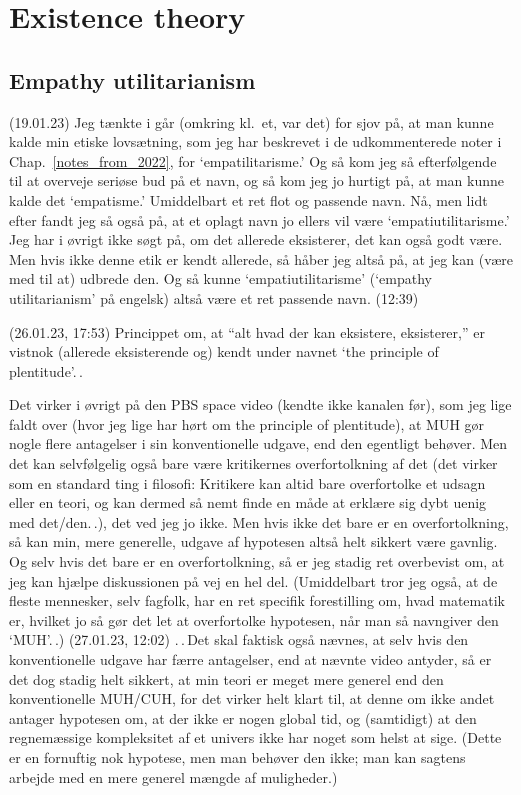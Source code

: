 \documentclass{report}
\begin{document}
\chapter{Existence theory}


\section{Empathy utilitarianism}

(19.01.23) Jeg tænkte i går (omkring kl.\ et, var det) for sjov på, at man kunne kalde min etiske lovsætning, som jeg har beskrevet i de udkommenterede noter i Chap.\ \ref{notes_from_2022}, for `empatilitarisme.' Og så kom jeg så efterfølgende til at overveje seriøse bud på et navn, og så kom jeg jo hurtigt på, at man kunne kalde det `empatisme.' Umiddelbart et ret flot og passende navn. Nå, men lidt efter fandt jeg så også på, at et oplagt navn jo ellers vil være `empatiutilitarisme.' Jeg har i øvrigt ikke søgt på, om det allerede eksisterer, det kan også godt være. Men hvis ikke denne etik er kendt allerede, så håber jeg altså på, at jeg kan (være med til at) udbrede den. Og så kunne `empatiutilitarisme' (`empathy utilitarianism' på engelsk) altså være et ret passende navn. (12:39)



(26.01.23, 17:53) Princippet om, at ``alt hvad der kan eksistere, eksisterer,'' er vistnok (allerede eksisterende og) kendt under navnet `the principle of plentitude'.\,.

Det virker i øvrigt på den PBS space video (kendte ikke kanalen før), som jeg lige faldt over (hvor jeg lige har hørt om the principle of plentitude), at MUH gør nogle flere antagelser i sin konventionelle udgave, end den egentligt behøver. Men det kan selvfølgelig også bare være kritikernes overfortolkning af det (det virker som en standard ting i filosofi: Kritikere kan altid bare overfortolke et udsagn eller en teori, og kan dermed så nemt finde en måde at erklære sig dybt uenig med det/den.\,.), det ved jeg jo ikke. Men hvis ikke det bare er en overfortolkning, så kan min, mere generelle, udgave af hypotesen altså helt sikkert være gavnlig. Og selv hvis det bare er en overfortolkning, så er jeg stadig ret overbevist om, at jeg kan hjælpe diskussionen på vej en hel del. (Umiddelbart tror jeg også, at de fleste mennesker, selv fagfolk, har en ret specifik forestilling om, hvad matematik er, hvilket jo så gør det let at overfortolke hypotesen, når man så navngiver den `MUH'.\,.) (27.01.23, 12:02) .\,.\,Det skal faktisk også nævnes, at selv hvis den konventionelle udgave har færre antagelser, end at nævnte video antyder, så er det dog stadig helt sikkert, at min teori er meget mere generel end den konventionelle MUH/CUH, for det virker helt klart til, at denne om ikke andet antager hypotesen om, at der ikke er nogen global tid, og (samtidigt) at den regnemæssige kompleksitet af et univers ikke har noget som helst at sige. (Dette er en fornuftig nok hypotese, men man behøver den ikke; man kan sagtens arbejde med en mere generel mængde af muligheder.)
\end{document}
